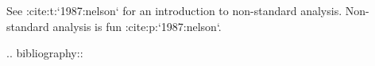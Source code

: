 See :cite:t:`1987:nelson` for an introduction to non-standard analysis.
Non-standard analysis is fun :cite:p:`1987:nelson`.

.. bibliography::